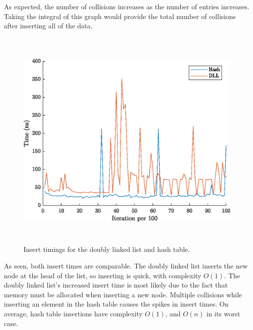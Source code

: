 \documentclass{article}
\begin{document}
As expected, the number of collisions increases as the number of entries increases. Taking the integral of this graph would provide the total number of collisions after inserting all of the data. 

\newpage

\begin{figure}[!htb]
    \centering
    \includegraphics[height=30em]{HashDLLInsert.eps}
    \caption{Insert timings for the doubly linked list and hash table.}
\end{figure}


As seen, both insert times are comparable. The doubly linked list inserts the new node at the head of the list, so inserting is quick, with complexity \( O(1) \). The doubly linked list's increased insert time is most likely due to the fact that memory must be allocated when inserting a new node. Multiple collisions while inserting an element in the hash table causes the spikes in insert times. On average, hash table insertions have complexity \( O(1) \), and \( O(n) \) in its worst case. 
\hfill \break
\end{document}
